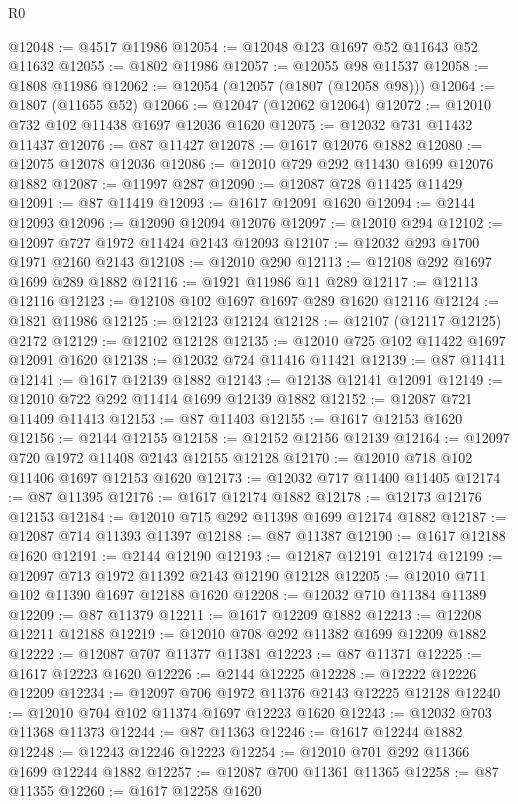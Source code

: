 \begin{lexlean}{R0}
\begin{coremodule}
@12048 := @4517 @11986
@12054 := @12048 @123 @1697 @52 @11643 @52 @11632
@12055 := @1802 @11986
@12057 := @12055 @98 @11537
@12058 := @1808 @11986
@12062 := @12054 (@12057 (@1807 (@12058 @98)))
@12064 := @1807 (@11655 @52)
@12066 := @12047 (@12062 @12064)
@12072 := @12010 @732 @102 @11438 @1697 @12036 @1620
@12075 := @12032 @731 @11432 @11437
@12076 := @87 @11427
@12078 := @1617 @12076 @1882
@12080 := @12075 @12078 @12036
@12086 := @12010 @729 @292 @11430 @1699 @12076 @1882
@12087 := @11997 @287
@12090 := @12087 @728 @11425 @11429
@12091 := @87 @11419
@12093 := @1617 @12091 @1620
@12094 := @2144 @12093
@12096 := @12090 @12094 @12076
@12097 := @12010 @294
@12102 := @12097 @727 @1972 @11424 @2143 @12093
@12107 := @12032 @293 @1700 @1971 @2160 @2143
@12108 := @12010 @290
@12113 := @12108 @292 @1697 @1699 @289 @1882
@12116 := @1921 @11986 @11 @289
@12117 := @12113 @12116
@12123 := @12108 @102 @1697 @1697 @289 @1620 @12116
@12124 := @1821 @11986
@12125 := @12123 @12124
@12128 := @12107 (@12117 @12125) @2172
@12129 := @12102 @12128
@12135 := @12010 @725 @102 @11422 @1697 @12091 @1620
@12138 := @12032 @724 @11416 @11421
@12139 := @87 @11411
@12141 := @1617 @12139 @1882
@12143 := @12138 @12141 @12091
@12149 := @12010 @722 @292 @11414 @1699 @12139 @1882
@12152 := @12087 @721 @11409 @11413
@12153 := @87 @11403
@12155 := @1617 @12153 @1620
@12156 := @2144 @12155
@12158 := @12152 @12156 @12139
@12164 := @12097 @720 @1972 @11408 @2143 @12155 @12128
@12170 := @12010 @718 @102 @11406 @1697 @12153 @1620
@12173 := @12032 @717 @11400 @11405
@12174 := @87 @11395
@12176 := @1617 @12174 @1882
@12178 := @12173 @12176 @12153
@12184 := @12010 @715 @292 @11398 @1699 @12174 @1882
@12187 := @12087 @714 @11393 @11397
@12188 := @87 @11387
@12190 := @1617 @12188 @1620
@12191 := @2144 @12190
@12193 := @12187 @12191 @12174
@12199 := @12097 @713 @1972 @11392 @2143 @12190 @12128
@12205 := @12010 @711 @102 @11390 @1697 @12188 @1620
@12208 := @12032 @710 @11384 @11389
@12209 := @87 @11379
@12211 := @1617 @12209 @1882
@12213 := @12208 @12211 @12188
@12219 := @12010 @708 @292 @11382 @1699 @12209 @1882
@12222 := @12087 @707 @11377 @11381
@12223 := @87 @11371
@12225 := @1617 @12223 @1620
@12226 := @2144 @12225
@12228 := @12222 @12226 @12209
@12234 := @12097 @706 @1972 @11376 @2143 @12225 @12128
@12240 := @12010 @704 @102 @11374 @1697 @12223 @1620
@12243 := @12032 @703 @11368 @11373
@12244 := @87 @11363
@12246 := @1617 @12244 @1882
@12248 := @12243 @12246 @12223
@12254 := @12010 @701 @292 @11366 @1699 @12244 @1882
@12257 := @12087 @700 @11361 @11365
@12258 := @87 @11355
@12260 := @1617 @12258 @1620

\end{coremodule}
\end{lexlean}
